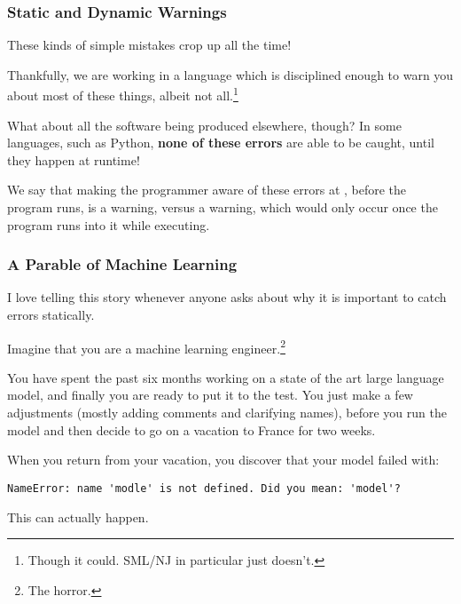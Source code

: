 \documentclass[aspectratio=169, handout]{beamer}
\begin{document}
\begin{frame}[fragile]
  \frametitle{Static and Dynamic Warnings}

  These kinds of simple mistakes crop up all the time!

  \pause
  \vspace{\fill}

  Thankfully, we are working in a language which is disciplined enough
  to warn you about most of these things, albeit not all.\footnote{Though it could.
  SML/NJ in particular just doesn't.}

  \pause
  \vspace{\fill}

  What about all the software being produced elsewhere, though? In some languages,
  such as Python, \textbf{none of these errors} are able to be caught, until they
  happen at runtime!

  \pause
  \vspace{\fill}

  We say that making the programmer aware of these errors at ,
  before the program runs, is a  warning, versus a 
  warning, which would only occur once the program runs into it while executing.
\end{frame}

\begin{frame}[fragile]
  \frametitle{A Parable of Machine Learning}

  I love telling this story whenever anyone asks about why it is important
  to catch errors statically.

  \pause
  \vspace{\fill}

  Imagine that you are a machine learning engineer.\footnote{The horror.}

  \pause
  \vspace{\fill}

  You have spent the past six months working on a state of the art large
  language model, and finally you are ready to put it to the test. You just
  make a few adjustments (mostly adding comments and clarifying names),
  before you run the model and then decide to go on a vacation to France for
  two weeks.

  \pause
  \vspace{\fill}

  When you return from your vacation, you discover that your model failed
  with:
  {\small
  \begin{lstlisting}[style=15150code, numbers=none]
    NameError: name 'modle' is not defined. Did you mean: 'model'?
  \end{lstlisting}
  }

  \pause
  \vspace{\fill}

  This can actually happen.
\end{frame}
\end{document}
